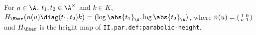 For $u\in\A$, $t_1,t_2\in\A^\times$ and $k\in K$,
$H_{\Bbar}\bigl(\bar n(u)\diag(t_1,t_2)k\bigr)=(\log\abs{t_1}_\A,\log\abs{t_2}_\A)$, where $\bar n(u)=\begin{psmallmatrix}1&0\\u&1\end{psmallmatrix}$ and $H_{\Bbar}$
is the height map of \texttt{II.par.def:parabolic-height}.
